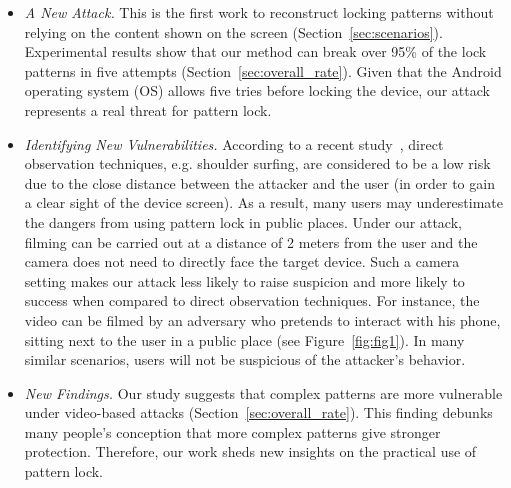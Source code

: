 \begin{itemize}
\item \emph{A New Attack.}%
This is the first work to reconstruct locking patterns without relying on
the content shown on the screen (Section~\ref{sec:scenarios}). %
Experimental results show that our method can break over
95\% of the lock patterns in five attempts (Section~\ref{sec:overall_rate}). Given that the Android
operating system (OS) allows five tries before
locking the device, our attack represents a real threat for pattern lock.

\item \emph{Identifying New Vulnerabilities.}
According to a recent study~\cite{DBLP:conf/soups/2014}, direct observation techniques, e.g. shoulder surfing, are considered to be a low risk due to the close distance between the attacker and the user (in order to gain a clear sight of the device screen).
As a result, many users may underestimate the dangers from using pattern lock in public places.
Under our attack, filming can be carried out at a distance of 2 meters from the user and the camera does not need to directly face the target device. Such a camera setting makes our attack less likely to raise suspicion and more likely to success when compared to direct observation techniques.
For
instance, the video can be filmed by an adversary who pretends to interact with his phone, sitting next to
the user in a public place (see Figure~\ref{fig:fig1}). In many similar scenarios, users will not be suspicious of the attacker's behavior.

\item \emph{New Findings.} Our study suggests that complex patterns are more vulnerable
under video-based attacks (Section~\ref{sec:overall_rate}). This finding debunks many people's conception
that more complex patterns give stronger protection. Therefore, our work sheds new insights on
 the practical use of pattern lock.

\end{itemize}
